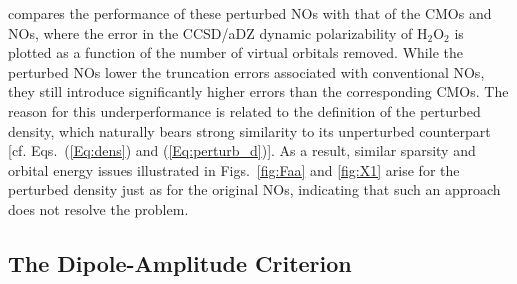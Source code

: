 compares the performance of these perturbed NOs with
that of the CMOs and NOs, where the error in the CCSD/aDZ dynamic
polarizability of H$_2$O$_2$ is plotted as a function of the number of virtual
orbitals removed. While the perturbed NOs lower the truncation errors
associated with conventional NOs, they still introduce significantly higher
errors than the corresponding CMOs.  The reason for this underperformance is
related to the definition of the perturbed density, which naturally bears
strong similarity to its unperturbed counterpart [cf. Eqs.~(\ref{Eq:dens}) and
(\ref{Eq:perturb_d})]. As a result, similar sparsity and orbital energy issues
illustrated in Figs.~\ref{fig:Faa} and \ref{fig:X1} arise for the perturbed
density just as for the original NOs, indicating that such an approach does not
resolve the problem.

\subsection{The Dipole-Amplitude Criterion}

